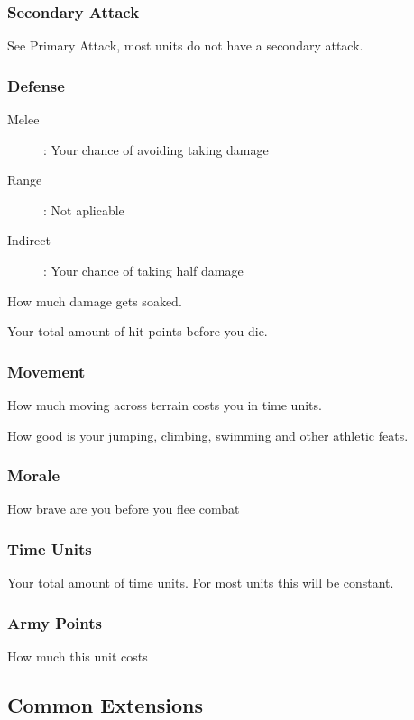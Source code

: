 \documentclass[a4paper,twocolumn]{article}
\begin{document}
\subsubsection{Secondary Attack}

See Primary Attack, most units do not have a secondary attack.

\subsubsection{Defense}

\begin{description}
\item[Melee]: Your chance of avoiding taking damage
\item[Range]: Not aplicable
\item[Indirect]: Your chance of taking half damage
\end{description}

How much damage gets soaked.

Your total amount of hit points before you die.

\subsubsection{Movement}

How much moving across terrain costs you in time units.

How good is your jumping, climbing, swimming and other athletic feats.

\subsubsection{Morale}
How brave are you before you flee combat

\subsubsection{Time Units}
Your total amount of time units. For most units this will be constant.

\subsubsection{Army Points}
How much this unit costs

\subsection{Common Extensions}
\end{document}
